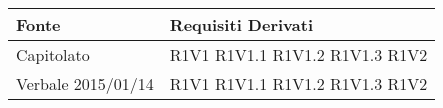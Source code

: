 	\begin{center}

	\def\arraystretch{1.5}
	\bgroup
	\begin{longtable}{| p{4cm} | p{4cm} |}

		\hline
		\textbf{Fonte} & \textbf{Requisiti Derivati} \\
		\hline

		Capitolato  &  R1V1 \newline R1V1.1 \newline R1V1.2 \newline R1V1.3 \newline R1V2 \\
		\hline
		Verbale 2015/01/14  &  R1V1 \newline R1V1.1 \newline R1V1.2 \newline R1V1.3 \newline R1V2  \\
		\hline

\end{longtable}
\end{center}
